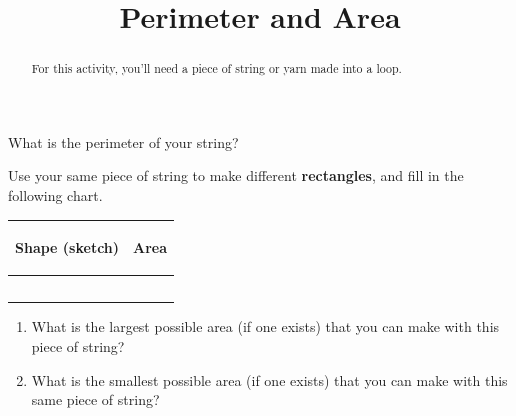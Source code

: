 \documentclass[noauthor,nooutcomes, handout]{ximera}
\title{Perimeter and Area}
\begin{document}
\begin{abstract} For this activity, you'll need a piece of string or yarn made into a loop. \end{abstract}
\maketitle



\begin{problem}
What is the perimeter of your string?  \end{problem}

\begin{problem} Use your same piece of string to make different {\bf rectangles}, and fill in the following chart.
\vskip 0.1in
\begin{tabular}{|p{2.2in}|p{2.2in}|}
\hline
\begin{center} Shape (sketch) \end{center} & \begin{center} Area \end{center}  \\ \hline
 & \\ [10ex] \hline
 & \\ [10 ex] \hline
 & \\ [10 ex] \hline
 & \\ [10 ex] \hline
 & \\ [10 ex] \hline
\end{tabular}
\begin{enumerate}

\item What is the largest possible area (if one exists) that you can make with this piece of string?
\item What is the smallest possible area (if one exists) that you can make with this same piece of string?
\end{enumerate}

\end{problem}
\newpage
\end{document}
